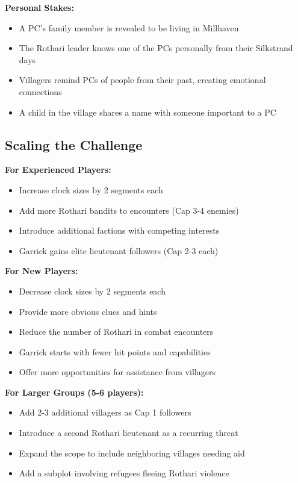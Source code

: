 \documentclass[11pt]{article}
\begin{document}
\textbf{Personal Stakes:}
\begin{itemize}
\item A PC's family member is revealed to be living in Millhaven
\item The Rothari leader knows one of the PCs personally from their Silkstrand days
\item Villagers remind PCs of people from their past, creating emotional connections
\item A child in the village shares a name with someone important to a PC
\end{itemize}

\subsection{Scaling the Challenge}

\textbf{For Experienced Players:}
\begin{itemize}
\item Increase clock sizes by 2 segments each
\item Add more Rothari bandits to encounters (Cap 3-4 enemies)
\item Introduce additional factions with competing interests
\item Garrick gains elite lieutenant followers (Cap 2-3 each)
\end{itemize}

\textbf{For New Players:}
\begin{itemize}
\item Decrease clock sizes by 2 segments each
\item Provide more obvious clues and hints
\item Reduce the number of Rothari in combat encounters
\item Garrick starts with fewer hit points and capabilities
\item Offer more opportunities for assistance from villagers
\end{itemize}

\textbf{For Larger Groups (5-6 players):}
\begin{itemize}
\item Add 2-3 additional villagers as Cap 1 followers
\item Introduce a second Rothari lieutenant as a recurring threat
\item Expand the scope to include neighboring villages needing aid
\item Add a subplot involving refugees fleeing Rothari violence
\end{itemize}
\end{document}
